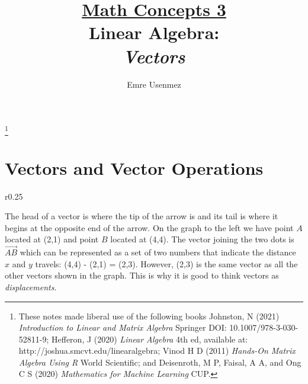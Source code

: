 \documentclass[11pt]{amsart} %
\theoremstyle{plain}
\theoremstyle{definition}
\theoremstyle{definition}
\theoremstyle{remark}
\theoremstyle{definition}
\begin{document}


\title{\underline{Math Concepts 3} \\
        Linear Algebra: \\
        \emph{Vectors}}

\author{Emre Usenmez}

\thanks{These notes made liberal use of the following books Johnston, N (2021) \textit{Introduction to Linear and Matrix Algebra} Springer DOI: 10.1007/978-3-030-52811-9; Hefferon, J (2020) \textit{Linear Algebra} 4th ed, available at: http://joshua.smcvt.edu/linearalgebra; Vinod H D (2011) \textit{Hands-On Matrix Algebra Using R} World Scientific; and Deisenroth, M P, Faisal, A A, and Ong C S (2020) \textit{Mathematics for Machine Learning} CUP.}

\maketitle

\section{Vectors and Vector Operations}

\noindent
\begin{wrapfigure}{r}{0.25\textwidth}
\end{wrapfigure}

The head of a vector is where the tip of the arrow is and its tail is where it begins at the opposite end of the arrow. On the graph to the left we have point $A$ located at (2,1) and point $B$ located at (4,4). The vector joining the two dots is $\overrightarrow{AB}$ which can be represented as a set of two numbers that indicate the distance $x$ and $y$ travels: (4,4) - (2,1) = (2,3). However, (2,3) is the same vector as all the other vectors shown in the graph. This is why it is good to think vectors as \emph{displacements.}
\end{document}
